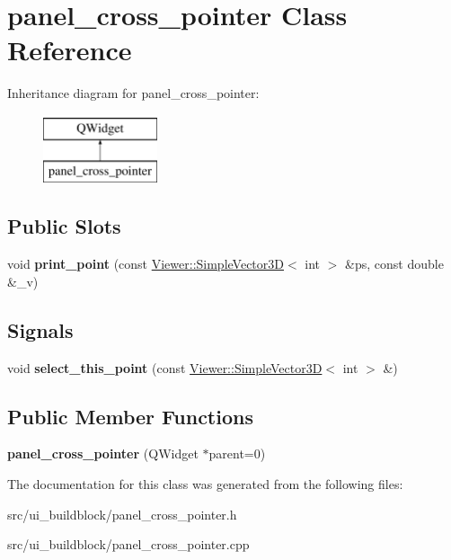\hypertarget{classpanel__cross__pointer}{}\section{panel\+\_\+cross\+\_\+pointer Class Reference}
\label{classpanel__cross__pointer}
Inheritance diagram for panel\+\_\+cross\+\_\+pointer\+:\begin{figure}[H]
\begin{center}
\leavevmode
\includegraphics[height=2.000000cm]{classpanel__cross__pointer}
\end{center}
\end{figure}
\subsection*{Public Slots}
\begin{DoxyCompactItemize}
\item 
\mbox{\label{classpanel__cross__pointer_a03403c4e7e2be4f368865ce2ec1542b7}} 
void {\bfseries print\+\_\+point} (const \mbox{\hyperlink{classViewer_1_1SimpleVector3D}{Viewer\+::\+Simple\+Vector3D}}$<$ int $>$ \&ps, const double \&\+\_\+v)
\end{DoxyCompactItemize}
\subsection*{Signals}
\begin{DoxyCompactItemize}
\item 
\mbox{\label{classpanel__cross__pointer_a8fefaeafa3c834de0e876c4c6ebd5867}} 
void {\bfseries select\+\_\+this\+\_\+point} (const \mbox{\hyperlink{classViewer_1_1SimpleVector3D}{Viewer\+::\+Simple\+Vector3D}}$<$ int $>$ \&)
\end{DoxyCompactItemize}
\subsection*{Public Member Functions}
\begin{DoxyCompactItemize}
\item 
\mbox{\label{classpanel__cross__pointer_a362b714054b0baa955d11a40b17edf7c}} 
{\bfseries panel\+\_\+cross\+\_\+pointer} (Q\+Widget $\ast$parent=0)
\end{DoxyCompactItemize}


The documentation for this class was generated from the following files\+:\begin{DoxyCompactItemize}
\item 
src/ui\+\_\+buildblock/panel\+\_\+cross\+\_\+pointer.\+h\item 
src/ui\+\_\+buildblock/panel\+\_\+cross\+\_\+pointer.\+cpp\end{DoxyCompactItemize}
